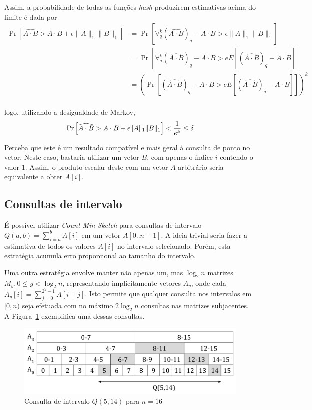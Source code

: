 Assim, a probabilidade de todas as funções \emph{hash} produzirem estimativas acima do limite é dada por
\begin{align*}
    \Pr\left[ \widehat{A \cdot B} > A \cdot B + \epsilon \lVert A \rVert_1 \lVert B \rVert_1 \right] 
    &= \Pr\left[ \forall_q^k (\widehat{A \cdot B})_q -  A \cdot B > \epsilon \lVert A \rVert_1 \lVert B \rVert_1 \right] \\
    &= \Pr\left[ \forall_q^k (\widehat{A \cdot B})_q -  A \cdot B > e  E\left[ (\widehat{A \cdot B})_q - A \cdot B \right]  \right] \\
    &= \left(\Pr\left[ (\widehat{A \cdot B})_q -  A \cdot B > e  E\left[ (\widehat{A \cdot B})_q - A \cdot B \right]  \right]\right)^k \\
\end{align*}

logo, utilizando a desigualdade de Markov,
\[
    \Pr\left[ \widehat{A \cdot B} > A \cdot B + \epsilon \lVert A \rVert_1 \lVert B \rVert_1 \right] < \frac{1}{e^k} \leq \delta \\
\]

Perceba que este é um resultado compatível e mais geral à consulta de ponto no vetor. Neste caso, bastaria utilizar um vetor $B$, com apenas o índice $i$ contendo o valor $1$. Assim, o produto escalar deste com um vetor $A$ arbitrário seria equivalente a obter $A[i]$.

\subsection{Consultas de intervalo}

É possível utilizar \emph{Count-Min Sketch} para consultas de intervalo $Q(a, b) = \sum_{i=a}^b A[i]$ em um vetor $A[0..n-1]$. A ideia trivial seria fazer a estimativa de todos os valores $A[i]$ no intervalo selecionado. Porém, esta estratégia acumula erro proporcional ao tamanho do intervalo.

Uma outra estratégia envolve manter não apenas um, mas $\log_2 n$ matrizes $M_y, 0 \leq y < \log_2 n$, representando implicitamente vetores $A_y$, onde cada $A_y[i] = \sum_{j=0}^{2^y-1} A[i+j]$. Isto permite que qualquer consulta nos intervalos em $[0, n)$ seja efetuada com no máximo $2 \log_2 n$ consultas nas matrizes subjacentes. A Figura~\ref{fig:countmin2} exemplifica uma dessas consultas.

\begin{figure}[!htbp]
  \centering
  \includegraphics[scale=0.45]{files/countmin2.pdf}
  \caption{Consulta de intervalo $Q(5, 14)$ para $n=16$}
  \label{fig:countmin2}
\end{figure}

